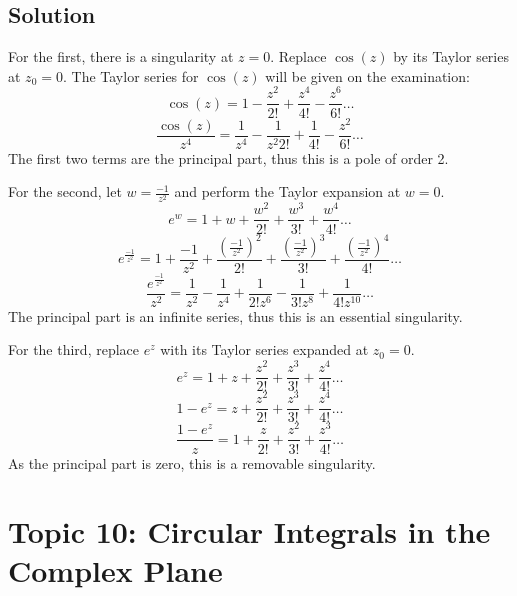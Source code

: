 \documentclass[12pt]{article}
\begin{document}
\subsection{Solution}

For the first, there is a singularity at $z=0$.  Replace $\cos(z)$ by its Taylor series at $z_0=0$.  The Taylor series for $\cos(z)$ will be given on the examination:
\begin{equation}
	\cos(z)=1-\frac{z^2}{2!}+\frac{z^4}{4!}-\frac{z^6}{6!}\dots
\end{equation}
\begin{equation}
	\frac{\cos(z)}{z^4}=\frac{1}{z^4}-\frac{1}{z^2 2!}+\frac{1}{4!}-\frac{z^2}{6!}\dots
\end{equation}
The first two terms are the principal part, thus this is a pole of order 2.

For the second, let $w=\frac{-1}{z^2}$ and perform the Taylor expansion at $w=0$.
\begin{equation}
	e^w=1+w+\frac{w^2}{2!}+\frac{w^3}{3!}+\frac{w^4}{4!}\dots
\end{equation}
\begin{equation}
	e^\frac{-1}{z^2}=1+\frac{-1}{z^2}+\frac{(\frac{-1}{z^2})^2}{2!}+\frac{(\frac{-1}{z^2})^3}{3!}+\frac{(\frac{-1}{z^2})^4}{4!}\dots
\end{equation}
\begin{equation}
	\frac{e^\frac{-1}{z^2}}{z^2}=\frac{1}{z^2}-\frac{1}{z^4}+\frac{1}{2!z^6}-\frac{1}{3!z^8}+\frac{1}{4!z^{10}}\dots
\end{equation}
The principal part is an infinite series, thus this is an essential singularity.

For the third, replace $e^z$ with its Taylor series expanded at $z_0=0$.
\begin{equation}
	e^z=1+z+\frac{z^2}{2!}+\frac{z^3}{3!}+\frac{z^4}{4!}\dots
\end{equation}
\begin{equation}
	1-e^z=z+\frac{z^2}{2!}+\frac{z^3}{3!}+\frac{z^4}{4!}\dots
\end{equation}
\begin{equation}
	\frac{1-e^z}{z}=1+\frac{z}{2!}+\frac{z^2}{3!}+\frac{z^3}{4!}\dots
\end{equation}
As the principal part is zero, this is a removable singularity.
\section{Topic 10: Circular Integrals in the Complex Plane}
\end{document}
